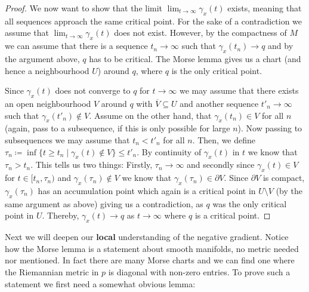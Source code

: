 \begin{proof}
We now want to show that the limit $\lim_{t\to \infty}\gamma_x(t)$ exists, meaning that all sequences approach the same critical point. 
	For the sake of a contradiction we assume that $\lim_{t\to \infty}\gamma_x(t)$ does not exist. 
	However, by the compactness of $M$ we can assume that there is a sequence $t_n\to \infty$ such that $\gamma_x(t_n)\to q$ and by the argument above, $q$ has to be critical. 
	The Morse lemma gives us a chart (and hence a neighbourhood $U$) around $q$, where $q$ is the only critical point.
	 
	Since $\gamma_x(t)$ does not converge to $q$ for $t\to  \infty$ we may assume that there exists an open neighbourhood $V$ around $q$ with $\overline{V}\subseteq U$  and another sequence $t'_n\to \infty$  such that $\gamma_x({t'_{n}})\notin V$. Assume on the other hand, that $\gamma_x(t_n)\in V$ for all $n$ (again, pass to a subsequence, if this is only possible for large $n$). 
	Now passing to subsequences we may assume that $t_n<t'_n$ for all $n$. Then, we define $\tau_n\coloneq \inf\{t\geq t_n \mid \gamma_x(t)\notin V\}\leq t'_n$. By continuity of $\gamma_x(t)$ in $t$ we know that $\tau_n>t_n$. This tells us two things: Firstly, $\tau_n\to \infty$ and secondly since $\gamma_x(t)\in V$ for $t\in [t_n,\tau_n)$ and $\gamma_x(\tau_n)\notin V$ we know that $\gamma_x(\tau_n)\in \partial V$. 
	Since $\partial V$ is compact, $\gamma_x(\tau_n)$ has an accumulation point which again is a critical point in $U\setminus V$ (by the same argument as above) giving us a contradiction, as $q$ was the only critical point in $U$.
	Thereby, $\gamma_x(t)\to q$ as $t\to \infty$ where $q$ is a critical point.

\end{proof}



Next we will deepen our \textbf{local} understanding of the negative gradient. Notice how the Morse lemma is a statement about smooth manifolds, no metric needed nor mentioned. In fact there are many Morse charts and we can find one where the Riemannian metric in $p$ is diagonal with non-zero entries. To prove such a statement we first need a somewhat obvious lemma:

